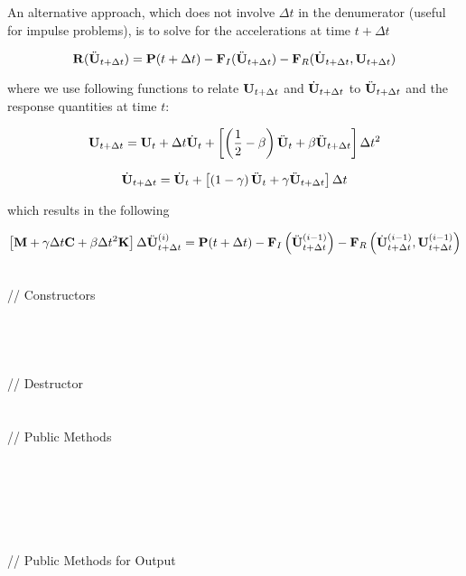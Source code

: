 \noindent An alternative approach, which does not involve $\Delta t$
in the denumerator (useful for impulse problems), is to solve for the
accelerations at time $t + \Delta t$ 

\[ {\bf R} (\ddot{\bf U}_{t + \Delta t}) = {\bf P}(t + \Delta t) - {\bf F}_I(\ddot{\bf U}_{t+\Delta t})
- {\bf F}_R(\dot{\bf U}_{t + \Delta t},{\bf U}_{t + \Delta t}) \]

\noindent where we use following functions to relate ${\bf U}_{t + \Delta
t}$ and $\dot{\bf U}_{t + \Delta t}$ to $\ddot{\bf U}_{t + \Delta t}$ and the response
quantities at time $t$:

\[
{\bf U}_{t + \Delta t} = {\bf U}_t + \Delta t \dot{\bf U}_t + \left[
\left(\frac{1}{2} - \beta\right)\ddot{\bf U}_t + \beta \ddot{\bf U}_{t + \Delta
t}\right] \Delta t^2
\]

\[
\dot{\bf U}_{t + \Delta t} = \dot{\bf U}_t + \left[ \left(1 - \gamma\right)\ddot{\bf U}_t +
\gamma\ddot{\bf U}_{t + \Delta t}\right] \Delta t
\]

\noindent which results in the following 

\[ \left[ {\bf M} + \gamma \Delta t {\bf C} + \beta \Delta t^2 {\bf K} \right] \Delta
\ddot{\bf U}_{t + \Delta t}^{(i)} = {\bf P}(t + \Delta t) - {\bf F}_I\left(\ddot{\bf U}_{t+\Delta 
t}^{(i-1)}\right)
- {\bf F}_R\left(\dot{\bf U}_{t + \Delta t}^{(i-1)},{\bf U}_{t + \Delta
t}^{(i-1)}\right) \]


\pagebreak
{} \\
\indent // Constructors \\
\\ 
\\ 
\\ \\
\indent // Destructor \\
\\ \\
\indent // Public Methods \\
 \\
 \\
\\
\\
 \\ \\
\indent // Public Methods for Output\\
\\ 
\\ 
\\


